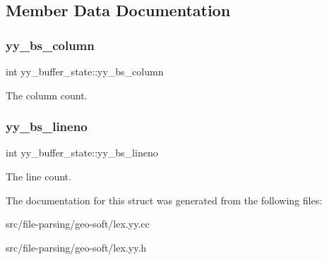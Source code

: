 \subsection{Member Data Documentation}
\mbox{\label{structyy__buffer__state_a10c4fcd8be759e6bf11e6d3e8cdb0307}} 
\subsubsection{\texorpdfstring{yy\+\_\+bs\+\_\+column}{yy\_bs\_column}}
{\footnotesize\ttfamily int yy\+\_\+buffer\+\_\+state\+::yy\+\_\+bs\+\_\+column}

The column count. \mbox{\label{structyy__buffer__state_a818e94bc9c766e683c60df1e9fd01199}} 
\subsubsection{\texorpdfstring{yy\+\_\+bs\+\_\+lineno}{yy\_bs\_lineno}}
{\footnotesize\ttfamily int yy\+\_\+buffer\+\_\+state\+::yy\+\_\+bs\+\_\+lineno}

The line count. 

The documentation for this struct was generated from the following files\+:\begin{DoxyCompactItemize}
\item 
src/file-\/parsing/geo-\/soft/lex.\+yy.\+cc\item 
src/file-\/parsing/geo-\/soft/lex.\+yy.\+h\end{DoxyCompactItemize}
